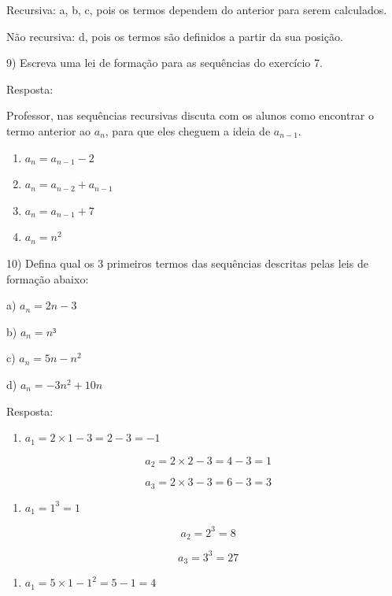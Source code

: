 Recursiva: a, b, c, pois os termos dependem do anterior para serem
calculados.

Não recursiva: d, pois os termos são definidos a partir da sua posição.

9) Escreva uma lei de formação para as sequências do exercício 7.

Resposta:

Professor, nas sequências recursivas discuta com os alunos como
encontrar o termo anterior ao \(a_{n}\), para que eles cheguem a ideia
de \(a_{n - 1}\).

\begin{enumerate}
\def\labelenumi{\alph{enumi})}
\item
  \(a_{n} = a_{n - 1} - 2\)
\item
  \(a_{n} = a_{n - 2} + a_{n - 1}\)
\item
  \(a_{n} = a_{n - 1} + 7\)
\item
  \(a_{n} = n^2\)
\end{enumerate}

10) Defina qual os 3 primeiros termos das sequências descritas pelas
leis de formação abaixo:

a) \(a_{n} = 2n - 3\)

b) \(a_{n} = n³\)

c) \(a_{n} = 5n - n^2\)

d) \(a_{n} = - 3n^{2} + 10n\)

Resposta:

\begin{enumerate}
\def\labelenumi{\alph{enumi})}
\tightlist
\item
  \(a_{1} = 2 \times 1 - 3 = 2 - 3 = - 1\)
\end{enumerate}

\[\text{\ \ \ \ \ }a_{2} = 2 \times 2 - 3 = 4 - 3 = 1\]

\[{\text{\ \ \ \ \ }a}_{3} = 2 \times 3 - 3 = 6 - 3 = 3\]

\begin{enumerate}
\def\labelenumi{\alph{enumi})}
\setcounter{enumi}{1}
\tightlist
\item
  \(a_{1} = 1^{3} = 1\)
\end{enumerate}

\[\text{\ \ \ \ \ }a_{2} = 2^{3} = 8\]

\[{\text{\ \ \ \ \ }a}_{3} = 3^{3} = 27\]

\begin{enumerate}
\def\labelenumi{\alph{enumi})}
\setcounter{enumi}{2}
\tightlist
\item
  \(a_{1} = 5 \times 1 - 1^{2} = 5 - 1 = 4\)
\end{enumerate}

